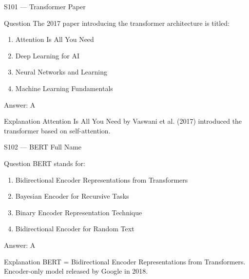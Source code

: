 \documentclass[aspectratio=169,8pt]{beamer}
\begin{document}
	\begin{frame}{S101 --- Transformer Paper}
		\begin{block}{Question}
			The 2017 paper introducing the transformer architecture is titled:
			\begin{enumerate}
				\item Attention Is All You Need
				\item Deep Learning for AI
				\item Neural Networks and Learning
				\item Machine Learning Fundamentals
			\end{enumerate}
		\end{block}
		\begin{exampleblock}{Answer: A}\end{exampleblock}
		\begin{block}{Explanation}
			Attention Is All You Need by Vaswani et al. (2017) introduced the transformer based on self-attention.
		\end{block}
	\end{frame}
	
	\begin{frame}{S102 --- BERT Full Name}
		\begin{block}{Question}
			BERT stands for:
			\begin{enumerate}
				\item Bidirectional Encoder Representations from Transformers
				\item Bayesian Encoder for Recursive Tasks
				\item Binary Encoder Representation Technique
				\item Bidirectional Encoder for Random Text
			\end{enumerate}
		\end{block}
		\begin{exampleblock}{Answer: A}\end{exampleblock}
		\begin{block}{Explanation}
			BERT = Bidirectional Encoder Representations from Transformers. Encoder-only model released by Google in 2018.
		\end{block}
	\end{frame}
	
\end{document}
